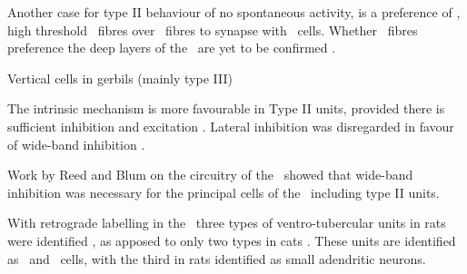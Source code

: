 Another case for type II behaviour of no spontaneous activity, is a preference of \LSR, high threshold \AN~fibres over \HSR~fibres to synapse with \TV~cells.
Whether \LSR~fibres preference the deep layers of the \CN~are yet to be confirmed \citep{Ryugo:2008,MeltzerRyugo:2006,RyugoParks:2003,BabalianJacommeEtAl:2002}.


\citep{Rhode:1999} Vertical cells in gerbils (mainly type III)


The intrinsic mechanism is more favourable in Type II units, provided there is sufficient inhibition and excitation \citep{HancockDavisEtAl:1997}.
Lateral inhibition was disregarded in favour of wide-band inhibition \citep{HancockDavisEtAl:1997}.

Work by Reed and Blum \citep{ReedBlum:1995,BlumReedEtAl:1995,ReedBlum:1997,BlumReed:1998} on the circuitry of the \DCN~showed that wide-band inhibition was necessary for the principal cells of the \DCN~including type II units.

With retrograde labelling in the \DCN~three types of ventro-tubercular units in rats were identified \citet{FriedlandPongstapornEtAl:2003}, as apposed to only two types in cats \citep{SmithRhode:1989,OertelWuEtAl:1990}.
These units are identified as \TS~and \DS~cells, with the third in rats identified as small adendritic neurons.











